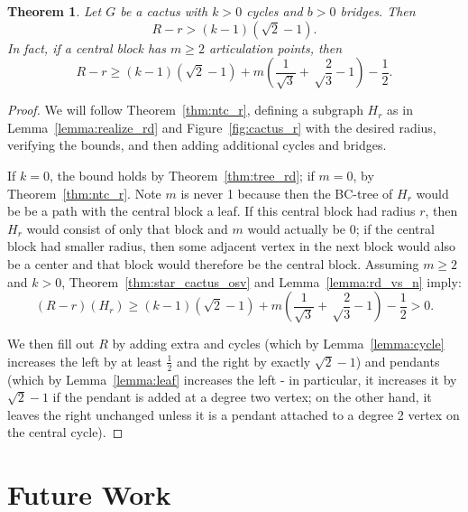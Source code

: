 \documentclass{amsart}
\newtheorem{thm}{Theorem}[section]%
\theoremstyle{definition}
\begin{document}
\begin{thm}\label{thm:cactus_r}
Let $G$ be a cactus with $k>0$ cycles and $b>0$ bridges. Then
\[R - r > (k-1)\left(\sqrt2-1\right).\]
In fact, if a central block has $m\geq 2$ articulation points, then
\[R-r \geq (k-1)\left(\sqrt2-1\right)+m\left(\frac{1}{\sqrt 3} + \sqrt\frac{2}{3}-1\right) - \frac{1}{2}.\]
\end{thm}

\begin{proof} 
We will follow Theorem~\ref{thm:ntc_r}, defining a subgraph $H_r$ as in Lemma~\ref{lemma:realize_rd} and Figure~\ref{fig:cactus_r} with the desired radius, verifying the bounds, and then adding additional cycles and bridges. 


If $k=0$, the bound holds by Theorem~\ref{thm:tree_rd}; if $m=0$, by Theorem~\ref{thm:ntc_r}. Note $m$ is never 1 because then the BC-tree of $H_r$ would be be a path with the central block a leaf. If this central block had radius $r$, then $H_r$ would consist of only that block and $m$ would actually be 0; if the central block had smaller radius, then some adjacent vertex in the next block would also be a center and that block would therefore be the central block. Assuming $m \geq 2$ and $k > 0$, Theorem~\ref{thm:star_cactus_osv} and Lemma~\ref{lemma:rd_vs_n} imply:
\[(R-r)(H_r) \geq (k-1)\left(\sqrt2-1\right)+m\left(\frac{1}{\sqrt 3} + \sqrt\frac{2}{3}-1\right) - \frac{1}{2} > 0.\]

We then fill out $R$ by adding extra and cycles (which by Lemma~\ref{lemma:cycle} increases the left by at least $\frac{1}{2}$ and the right by exactly $\sqrt 2 - 1$) and pendants (which by Lemma~\ref{lemma:leaf} increases the left - in particular, it increases it by $\sqrt 2-1$ if the pendant is added at a degree two vertex; on the other hand, it leaves the right unchanged unless it is a pendant attached to a degree 2 vertex on the central cycle). 
\end{proof}

\section{Future Work}
\end{document}
